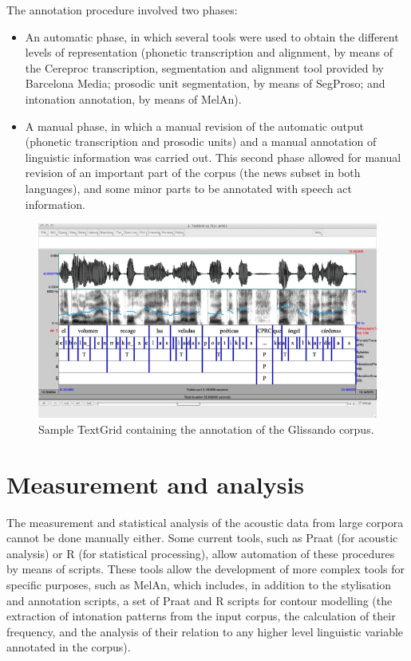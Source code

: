 \documentclass[output=paper]{langsci/langscibook}
\begin{document}
The annotation procedure involved two phases: 

\begin{itemize}
\item
An automatic phase, in which several tools were used to obtain the different levels of representation (phonetic transcription and alignment, by means of the Cereproc transcription, segmentation and alignment tool provided by Barcelona Media; prosodic unit segmentation, by means of SegProso; and intonation annotation, by means of MelAn).

\item
A manual phase, in which a manual revision of the automatic output (phonetic transcription and prosodic units) and a manual annotation of linguistic information was carried out. This second phase allowed for manual revision of an important part of the corpus (the news subset in both languages), and some minor parts to be annotated with speech act information. 
\end{itemize}

\begin{figure}
\includegraphics[width=\textwidth]{figures/GAR-img007.png}
\caption{Sample TextGrid containing the annotation of the Glissando corpus.}
\label{fig:gar:7}
\end{figure}

\section{Measurement and analysis}

The measurement and statistical analysis of the acoustic data from large corpora cannot be done manually either. Some current tools, such as Praat (for acoustic analysis) or R (for statistical processing), allow automation of these procedures by means of scripts. These tools allow the development of more complex tools for specific purposes, such as MelAn, which includes, in addition to the stylisation and annotation scripts, a set of Praat and R scripts for contour modelling (the extraction of intonation patterns from the input corpus, the calculation of their frequency, and the analysis of their relation to any higher level linguistic variable annotated in the corpus).
\end{document}
